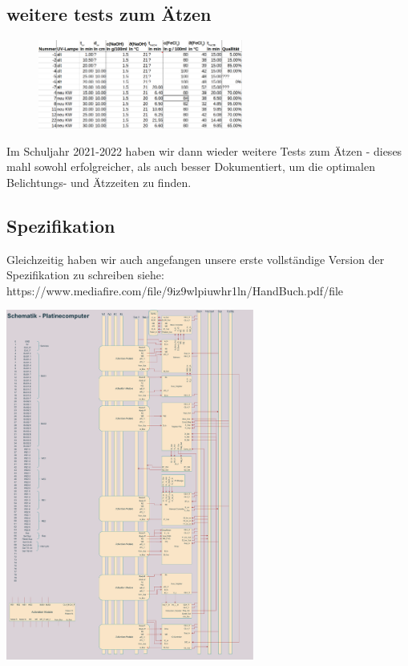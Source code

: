 \documentclass{scrartcl}
\begin{document}
    \subsection{weitere tests zum Ätzen}
        \begin{figure}
        \vspace{-40pt}
        \begin{center}
        \includegraphics[width=0.6\textwidth]{aetzen_tabelle}
        \end{center}
        \vspace{-20pt}
        \end{figure}
    Im Schuljahr 2021-2022 haben wir dann wieder weitere Tests zum Ätzen - dieses mahl sowohl erfolgreicher, als auch besser Dokumentiert, um die optimalen Belichtungs- und Ätzzeiten zu finden.

    \subsection{Spezifikation}
    Gleichzeitig haben wir auch angefangen unsere erste vollständige Version der Spezifikation zu schreiben siehe: https://www.mediafire.com/file/9iz9wlpiuwhr1ln/HandBuch.pdf/file

    \includegraphics[width=0.612\textwidth, ]{arch.drawio}
    
\end{document}
